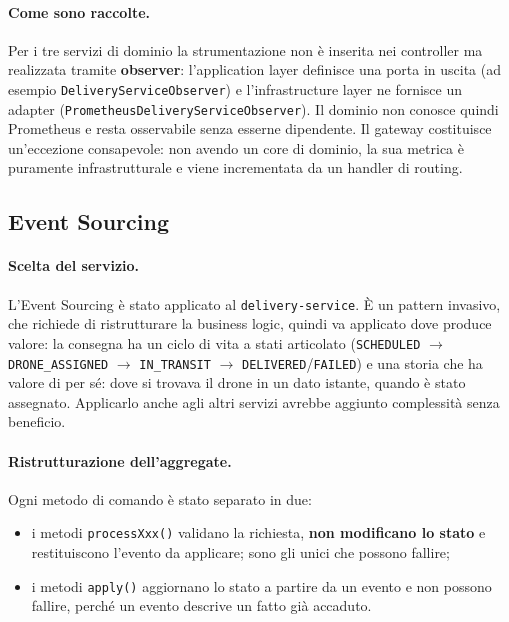 \documentclass[12pt,a4paper]{article}
\begin{document}
\paragraph{Come sono raccolte.}
\label{sec:metriche-gateway}
Per i tre servizi di dominio la strumentazione non \`e inserita nei
controller ma realizzata tramite \textbf{observer}: l'application layer definisce una porta in
uscita (ad esempio \texttt{DeliveryServiceObserver}) e l'infrastructure layer ne fornisce un adapter
(\texttt{PrometheusDeliveryServiceObserver}). Il dominio non conosce quindi Prometheus e resta
osservabile senza esserne dipendente. Il gateway costituisce un'eccezione consapevole: non avendo un
core di dominio, la sua metrica \`e puramente infrastrutturale e viene incrementata da un handler di
routing.

\subsection{Event Sourcing}
\label{sec:eventsourcing}

\paragraph{Scelta del servizio.} L'Event Sourcing \`e stato applicato al \texttt{delivery-service}.
\`E un pattern invasivo, che richiede di ristrutturare la business logic, quindi va applicato dove
produce valore: la consegna ha un ciclo di vita a stati articolato
(\texttt{SCHEDULED} $\rightarrow$ \texttt{DRONE\_ASSIGNED} $\rightarrow$ \texttt{IN\_TRANSIT}
$\rightarrow$ \texttt{DELIVERED}/\texttt{FAILED}) e una storia che ha valore di per s\'e: dove si
trovava il drone in un dato istante, quando \`e stato assegnato. Applicarlo anche agli altri servizi
avrebbe aggiunto complessit\`a senza beneficio.

\paragraph{Ristrutturazione dell'aggregate.} Ogni metodo di comando \`e stato separato in due:

\begin{itemize}
  \item i metodi \texttt{processXxx()} validano la richiesta, \textbf{non modificano lo stato} e
        restituiscono l'evento da applicare; sono gli unici che possono fallire;
  \item i metodi \texttt{apply()} aggiornano lo stato a partire da un evento e non possono fallire,
        perch\'e un evento descrive un fatto gi\`a accaduto.
\end{itemize}
\end{document}
